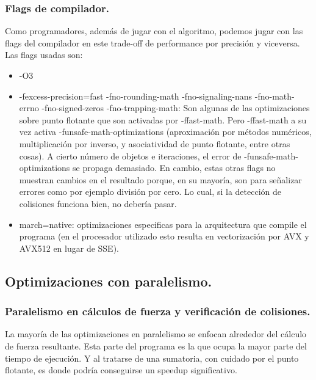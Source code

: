 \documentclass{article}
\begin{document}
\subsubsection{Flags de compilador.\label{compiler}}
Como programadores, además de jugar con el algoritmo, podemos jugar con las flags
del compilador en este trade-off de performance por precisión y viceversa.
Las flags usadas son:
\begin{itemize}
		\item -O3
		\item -fexcess-precision=fast -fno-rounding-math -fno-signaling-nans
			-fno-math-errno -fno-signed-zeros -fno-trapping-math: Son algunas de las optimizaciones
			sobre punto flotante que son activadas por -ffast-math. Pero -ffast-math
			a su vez activa -funsafe-math-optimizations (aproximación por métodos numéricos, multiplicación por inverso, y asociatividad
			de punto flotante, entre otras cosas). A cierto número de objetos e iteraciones, el error
			de -funsafe-math-optimizations se propaga demasiado. En cambio, estas otras flags no muestran cambios en el resultado porque, en su
			mayoría, son para señalizar errores como por ejemplo división por cero. Lo cual, si la detección
			de colisiones funciona bien, no debería pasar.
		\item march=native: optimizaciones especificas para la arquitectura que compile el programa (en el procesador
			utilizado esto resulta en vectorización por AVX y AVX512 en lugar de SSE).
\end{itemize}

\subsection{Optimizaciones con paralelismo.\label{opt_parallel}}
\subsubsection{Paralelismo en cálculos de fuerza y verificación de colisiones.}
La mayoría de las optimizaciones en paralelismo se enfocan alrededor del cálculo de fuerza resultante.
Esta parte del programa es la que ocupa la mayor parte del tiempo de ejecución. Y al tratarse de una sumatoria,
con cuidado por el punto flotante, es donde podría conseguirse un speedup significativo.
\end{document}
